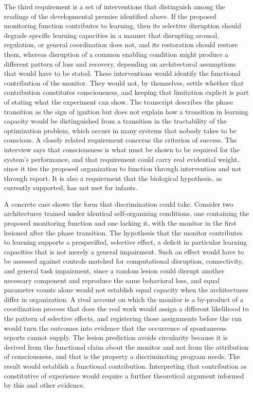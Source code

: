 \documentclass[11pt]{article}
\begin{document}
The third requirement is a set of interventions that distinguish among the readings of the developmental premise identified above. If the proposed monitoring function contributes to learning, then its selective disruption should degrade specific learning capacities in a manner that disrupting arousal, regulation, or general coordination does not, and its restoration should restore them, whereas disruption of a common enabling condition might produce a different pattern of loss and recovery, depending on architectural assumptions that would have to be stated. These interventions would identify the functional contribution of the monitor. They would not, by themselves, settle whether that contribution constitutes consciousness, and keeping that limitation explicit is part of stating what the experiment can show. The transcript describes the phase transition as the sign of ignition but does not explain how a transition in learning capacity would be distinguished from a transition in the tractability of the optimization problem, which occurs in many systems that nobody takes to be conscious. A closely related requirement concerns the criterion of success. The interview says that consciousness is what must be shown to be required for the system's performance, and that requirement could carry real evidential weight, since it ties the proposed organization to function through intervention and not through report. It is also a requirement that the biological hypothesis, as currently supported, has not met for infants.

A concrete case shows the form that discrimination could take. Consider two architectures trained under identical self-organizing conditions, one containing the proposed monitoring function and one lacking it, with the monitor in the first lesioned after the phase transition. The hypothesis that the monitor contributes to learning supports a prespecified, selective effect, a deficit in particular learning capacities that is not merely a general impairment. Such an effect would have to be assessed against controls matched for computational disruption, connectivity, and general task impairment, since a random lesion could disrupt another necessary component and reproduce the same behavioral loss, and equal parameter counts alone would not establish equal capacity when the architectures differ in organization. A rival account on which the monitor is a by-product of a coordination process that does the real work would assign a different likelihood to the pattern of selective effects, and registering those assignments before the run would turn the outcomes into evidence that the occurrence of spontaneous reports cannot supply. The lesion prediction avoids circularity because it is derived from the functional claim about the monitor and not from the attribution of consciousness, and that is the property a discriminating program needs. The result would establish a functional contribution. Interpreting that contribution as constitutive of experience would require a further theoretical argument informed by this and other evidence.
\end{document}
